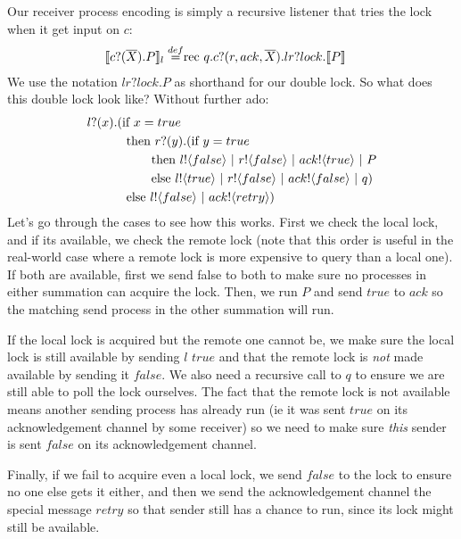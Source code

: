 Our receiver process encoding is simply a recursive listener that tries the lock when it get input on $c$:
\begin{equation*}\begin{split}
	\llbracket{ \ensuremath{{c}?({\overline{X}}).} P}\rrbracket_l \overset{\tiny{def}}{=} & \text{rec }{q}.{c}?({r,ack,\overline{X}}). lr?lock.\llbracket{P}\rrbracket
\end{split}\end{equation*}
We use the notation $lr?lock.P$ as shorthand for our double lock.
So what does this double lock look like?  Without further ado:
\begin{equation}\begin{split}
	{l}?({x}).(&\text{if } {x=true}\\
	&\text{ then } {r}?({y}). (\text{if } {y=true}\\
	&\ \ \ \ \ \ \text{ then } {l}!\langle{false}\rangle \ |\  {r}!\langle{false}\rangle \ |\  {ack}!\langle{true}\rangle \ |\  P\\
	&\ \ \ \ \ \ \text{ else } {l}!\langle{true}\rangle \ |\  {r}!\langle{false}\rangle \ |\  {ack}!\langle{false}\rangle \ |\  q)\\
	&\text{ else }{l}!\langle{false}\rangle \ |\  {ack}!\langle{retry}\rangle)\\
\end{split}\end{equation}%
Let's go through the cases to see how this works.  First we check the local lock, and if its available, we check the remote lock (note that this order is useful in the real-world case where a remote lock is more expensive to query than a local one).  If both are available, first we send false to both to make sure no processes in either summation can acquire the lock.  Then, we run $P$ and send $true$ to $ack$ so the matching send process in the other summation will run.

If the local lock is acquired but the remote one cannot be, we make sure the local lock is still available by sending $l$ $true$ and that the remote lock is \emph{not} made available by sending it $false$.  We also need a recursive call to $q$ to ensure we are still able to poll the lock ourselves.  The fact that the remote lock is not available means another sending process has already run (ie it was sent $true$ on its acknowledgement channel by some receiver) so we need to make sure \emph{this} sender is sent $false$ on its acknowledgement channel.

Finally, if we fail to acquire even a local lock, we send $false$ to the lock to ensure no one else gets it either, and then we send the acknowledgement channel the special message $retry$ so that sender still has a chance to run, since its lock might still be available.

